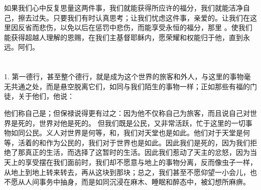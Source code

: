 如果我们心中反复思量这两件事，我们就能获得所应许的福分，我们就能洁净自己，擦去过失。只要我们有时认真思考；让我们忧虑这件事，亲爱的。让我们在这里因反省而悲伤，以免以后在惩罚中悲伤，而能享受永恒的福分，那里 。使我们能获得超越人理解的恩赐，在我们主基督耶稣内，愿荣耀和权能归于他，直到永远。阿们。\par



\section{}


\subsection{}

\par

1. 第一德行，甚至整个德行，就是成为这个世界的旅客和外人，与这里的事物毫无共通之处，而是悬空脱离它们，如同与我们陌生的事物一样；正如那些有福的门徒，关于他们，他说：\par

他们称自己是；但保禄说得更有过之：因为他不仅称自己为旅客，而且说自己对世界是死的，世界对他是死的。 但我们既是公民，又非常活跃，忙于这里的一切事物如同公民。义人对世界是何等，和，我们对天堂也是如此。他们对于天堂是何等，活着的和作为公民的，我们对于世界也是如此。因此我们是死的，因为我们拒绝了那真正的生活，而选择了这暂时的生活。因此我们惹动了天主的忿怒，因为当天上的享受摆在我们面前时，我们却不愿意与地上的事物分离，反而像虫子一样，从地上到地上转来转去，再从这块到那块；总之，我们甚至不愿仰望一小会儿，也不愿从人间事务中抽身，而是如同沉浸在麻木、睡眠和醉态中，被幻想所麻痹。\par

